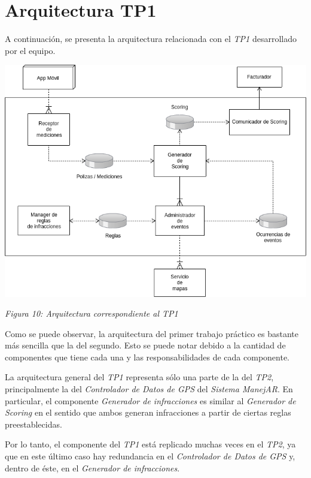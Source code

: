 \section{Arquitectura TP1}

A continuación, se presenta la arquitectura relacionada con el \textit{TP1} desarrollado por el equipo.

\begin{center}
  \includegraphics[width=1\textwidth]{./imagenes/tp1.png}
  \centerline{\textit{Figura 10: Arquitectura correspondiente al TP1}}
\end{center}

Como se puede observar, la arquitectura del primer trabajo práctico es bastante más sencilla
que la del segundo. Esto se puede notar debido a la cantidad de componentes que tiene cada una y
las responsabilidades de cada componente.


La arquitectura general del \textit{TP1} representa sólo una parte de la del \textit{TP2}, principalmente la del
\textit{Controlador de Datos de GPS} del \textit{Sistema ManejAR}. 
En particular, el componente \textit{Generador de infracciones} es similar al \textit{Generador de Scoring} en el
sentido que ambos generan infracciones a partir de ciertas reglas preestablecidas.


Por lo tanto, el componente del \textit{TP1} está replicado muchas veces en el \textit{TP2}, ya que en este último caso
hay redundancia en el \textit{Controlador de Datos de GPS} y, dentro de éste, en el \textit{Generador de infracciones}.






